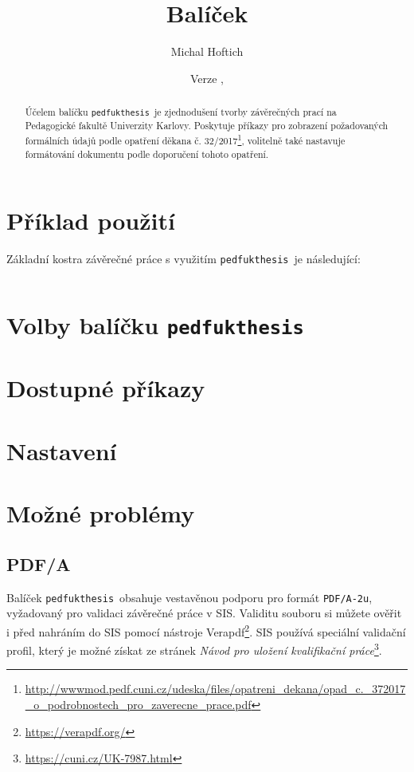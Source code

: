 \documentclass{ltxdoc}
\title{Balíček \pkgname}
\author{Michal Hoftich}
\date{Verze \version, \gitdate}
\newcommand\pkgname{\texttt{pedfukthesis}}
\begin{document}
\maketitle

\begin{abstract}
\noindent Účelem balíčku \pkgname\ je zjednodušení tvorby závěrečných prací na
Pedagogické fakultě Univerzity Karlovy. Poskytuje příkazy pro zobrazení
požadovaných formálních údajů podle opatření děkana č.
32/2017\footnote{\url{http://wwwmod.pedf.cuni.cz/udeska/files/opatreni_dekana/opad_c._372017_o_podrobnostech_pro_zaverecne_prace.pdf}},
volitelně také nastavuje formátování dokumentu podle doporučení tohoto
opatření.
\end{abstract}

\tableofcontents

\section{Příklad použití}

Základní kostra závěrečné práce s využitím \pkgname\ je následující:

\inputminted{latex}{example/basic.tex}




\section{Volby balíčku \pkgname}

\section{Dostupné příkazy}

\section{Nastavení}

\section{Možné problémy}
\subsection{PDF/A}
Balíček \pkgname\ obsahuje vestavěnou podporu pro formát \texttt{PDF/A-2u},
vyžadovaný pro validaci závěrečné práce v SIS. Validitu souboru si můžete
ověřit i před nahráním do SIS pomocí nástroje
Verapdf\footnote{\url{https://verapdf.org/}}. SIS používá speciální validační
profil, který je možné získat ze stránek
\textit{Návod pro uložení kvalifikační práce}\footnote{\url{https://cuni.cz/UK-7987.html}}.
\end{document}
